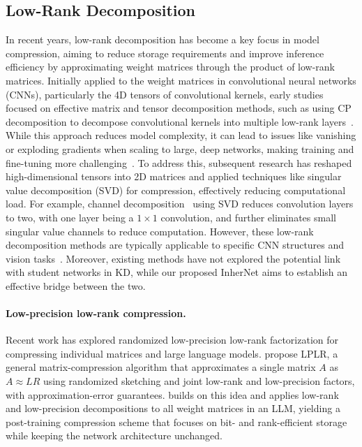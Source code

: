 \documentclass{article} %
\begin{document}
\subsection{Low-Rank Decomposition}
\label{sec:lora}
In recent years, low-rank decomposition has become a key focus in model compression, aiming to reduce storage requirements and improve inference efficiency by approximating weight matrices through the product of low-rank matrices. Initially applied to the weight matrices in convolutional neural networks (CNNs), particularly the 4D tensors of convolutional kernels, early studies~\citep{denton2014exploiting, lebedev2014speeding, tai2015convolutional, xu2019trained, yang2020learning} focused on effective matrix and tensor decomposition methods, such as using CP decomposition to decompose convolutional kernels into multiple low-rank layers~\citep{lebedev2014speeding}. While this approach reduces model complexity, it can lead to issues like vanishing or exploding gradients when scaling to large, deep networks, making training and fine-tuning more challenging~\citep{tai2015convolutional}. To address this, subsequent research has reshaped high-dimensional tensors into 2D matrices and applied techniques like singular value decomposition (SVD) for compression, effectively reducing computational load. For example, channel decomposition~\citep{zhang2015accelerating} using SVD reduces convolution layers to two, with one layer being a $1\times 1$ convolution, and further eliminates small singular value channels to reduce computation. However, these low-rank decomposition methods are typically applicable to specific CNN structures and vision tasks~\citep{wang2026unified}. Moreover, existing methods have not explored the potential link with student networks in KD, while our proposed InherNet aims to establish an effective bridge between the two.

\paragraph{Low-precision low-rank compression.}
Recent work has explored randomized low-precision low-rank factorization for compressing individual matrices and large language models. \cite{saha2023matrix} propose LPLR, a general matrix-compression algorithm that approximates a single matrix $A$ as $A \approx LR$ using randomized sketching and joint low-rank and low-precision factors, with approximation-error guarantees. \cite{saha2024compressing} builds on this idea and applies low-rank and low-precision decompositions to all weight matrices in an LLM, yielding a post-training compression scheme that focuses on bit- and rank-efficient storage while keeping the network architecture unchanged. 
\end{document}
